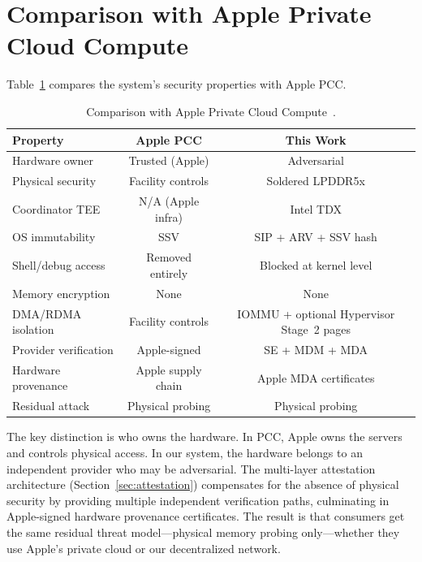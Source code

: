 \documentclass[10pt,twocolumn,letterpaper]{article}
\begin{document}
\section{Comparison with Apple Private Cloud Compute}
\label{sec:pcc-comparison}

Table~\ref{tab:pcc} compares the system's security properties with Apple PCC.

\begin{table}[h]
\centering
\caption{Comparison with Apple Private Cloud Compute~\cite{apple-pcc}.}
\label{tab:pcc}
\vspace{4pt}
\small
\begin{tabular}{@{}lcc@{}}
\toprule
\textbf{Property} & \textbf{Apple PCC} & \textbf{This Work} \\
\midrule
Hardware owner & Trusted (Apple) & Adversarial \\
Physical security & Facility controls & Soldered LPDDR5x \\
Coordinator TEE & N/A (Apple infra) & Intel TDX \\
OS immutability & SSV & SIP + ARV + SSV hash \\
Shell/debug access & Removed entirely & Blocked at kernel level \\
Memory encryption & None & None \\
DMA/RDMA isolation & Facility controls & IOMMU + optional Hypervisor Stage~2 pages \\
Provider verification & Apple-signed & SE + MDM + MDA \\
Hardware provenance & Apple supply chain & Apple MDA certificates \\
Residual attack & Physical probing & Physical probing \\
\bottomrule
\end{tabular}
\end{table}

The key distinction is who owns the hardware. In PCC, Apple owns the servers and controls physical access. In our system, the hardware belongs to an independent provider who may be adversarial. The multi-layer attestation architecture (Section~\ref{sec:attestation}) compensates for the absence of physical security by providing multiple independent verification paths, culminating in Apple-signed hardware provenance certificates. The result is that consumers get the same residual threat model---physical memory probing only---whether they use Apple's private cloud or our decentralized network.
\end{document}
